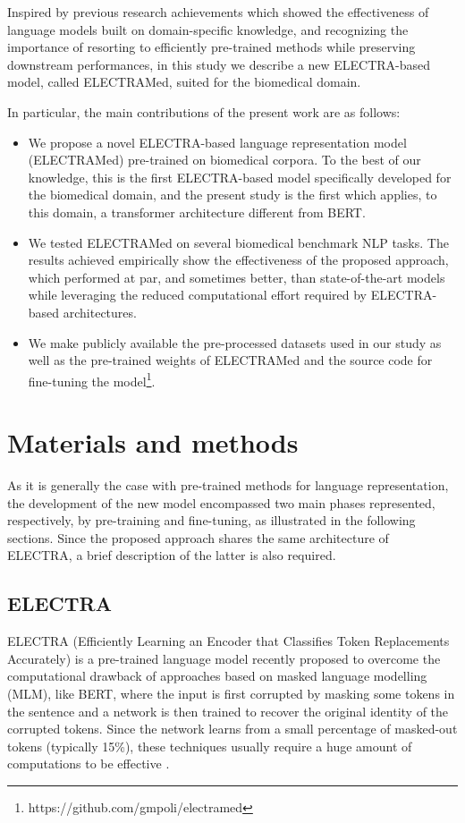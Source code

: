 \documentclass{article}
\begin{document}
Inspired by previous research achievements which showed the effectiveness of language models built on domain-specific knowledge, and recognizing the importance of resorting to efficiently pre-trained methods while preserving downstream performances, in this study we describe a new ELECTRA-based model, called ELECTRAMed, suited for the biomedical domain.  

In particular, the main contributions of the present work are as follows:
\begin{itemize}
    \item We propose a novel ELECTRA-based language representation model (ELECTRAMed) pre-trained on biomedical corpora. To the best of our knowledge, this is the first ELECTRA-based model specifically developed for the biomedical domain, and the present study is the first which applies, to this domain, a transformer architecture different from BERT.
    \item We tested ELECTRAMed on several biomedical benchmark NLP tasks. The results achieved empirically show the effectiveness of the proposed approach, which performed at par, and sometimes better, than state-of-the-art models while leveraging the reduced computational effort required by ELECTRA-based architectures.
    \item We make publicly available the pre-processed datasets used in our study as well as the pre-trained weights of ELECTRAMed and the source code for fine-tuning the model\setcounter{footnote}{0}\footnote{https://github.com/gmpoli/electramed}.
\end{itemize}

\section{Materials and methods}
As it is generally the case with pre-trained methods for language representation, the development of the new model encompassed two main phases represented, respectively, by pre-training and fine-tuning, as illustrated in the following sections.
Since the proposed approach shares the same architecture of ELECTRA, a brief description of the latter is also required.

\subsection{ELECTRA}
ELECTRA (Efficiently Learning an Encoder that Classifies Token Replacements Accurately) is a pre-trained language model recently proposed to overcome the computational drawback of approaches based on masked language modelling (MLM), like BERT, where the input is first corrupted by masking some tokens in the sentence and a network is then trained to recover the original identity of the corrupted tokens. 
Since the network learns from a small percentage of masked-out tokens (typically 15\%), these techniques usually require a huge amount of computations to be effective \citep{Clark20}.
\end{document}
